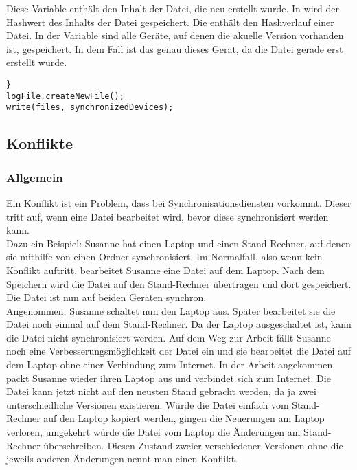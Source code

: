 \begin{description}
	Diese Variable enthält den Inhalt der Datei, die neu erstellt wurde.
	In  wird der Hashwert des Inhalts der Datei gespeichert.
	Die  enthält den Hashverlauf einer Datei. 
	In der Variable  sind alle Geräte, auf denen die akuelle Version vorhanden ist, gespeichert. In dem Fall ist das genau dieses Gerät, da die Datei gerade erst erstellt wurde.
\end{description}
\javalisting
\begin{minipage}{\linewidth}
\begin{lstlisting}[caption={Erkennen eines Konflikts},captionpos=b]
}
logFile.createNewFile();
write(files, synchronizedDevices);
\end{lstlisting}
\end{minipage}
 
\subsection{Konflikte}\label{Konflikt}
\subsubsection{Allgemein}
Ein Konflikt ist ein Problem, dass bei Synchronisationsdiensten vorkommt. Dieser tritt auf, wenn eine Datei bearbeitet wird, bevor diese synchronisiert werden kann. \\
Dazu ein Beispiel: Susanne hat einen Laptop und einen Stand-Rechner, auf denen sie mithilfe von \sblit einen Ordner synchronisiert. Im Normalfall, also wenn kein Konflikt auftritt, bearbeitet Susanne eine Datei auf dem Laptop. Nach dem Speichern wird die Datei auf den Stand-Rechner übertragen und dort gespeichert. Die Datei ist nun auf beiden Geräten synchron.\\
Angenommen, Susanne schaltet nun den Laptop aus. Später bearbeitet sie die Datei noch einmal auf dem Stand-Rechner. Da der Laptop ausgeschaltet ist, kann die Datei nicht synchronisiert werden. Auf dem Weg zur Arbeit fällt Susanne noch eine Verbesserungsmöglichkeit der Datei ein und sie bearbeitet die Datei auf dem Laptop ohne einer Verbindung zum Internet. In der Arbeit angekommen, packt Susanne wieder ihren Laptop aus und verbindet sich zum Internet. Die Datei kann jetzt nicht auf den neusten Stand gebracht werden, da ja zwei unterschiedliche Versionen existieren. Würde die Datei einfach vom Stand-Rechner auf den Laptop kopiert werden, gingen die Neuerungen am Laptop verloren, umgekehrt würde die Datei vom Laptop die Änderungen am Stand-Rechner überschreiben. Diesen Zustand zweier verschiedener Versionen ohne die jeweils anderen Änderungen nennt man einen Konflikt.

